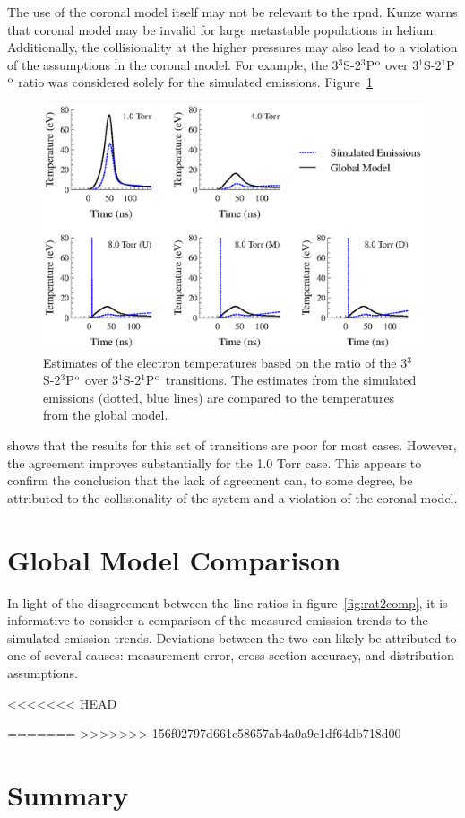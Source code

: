 The use of the coronal model itself may not be relevant to the \acs{rpnd}. Kunze
\cite{Kunze2009} warns that coronal model may be invalid for large metastable
populations in helium. Additionally, the collisionality at the higher pressures
may also lead to a violation of the assumptions in the coronal model. For
example, the 3$^3$S-2$^3$P$^\mathrm{o}$ over 3$^1$S-2$^1$P$^\mathrm{o}$ ratio was considered
solely for the simulated emissions. Figure~\ref{fig:rat1comp}
\begin{figure}
  \centering
  \includegraphics{./chapters/emissions/figures/rat1comp.eps}
  \caption{Estimates of the electron temperatures based on the ratio of the
    3$^3$S-2$^3$P$^\mathrm{o}$ over 3$^1$S-2$^1$P$^\mathrm{o}$ transitions. The estimates from
    the simulated emissions (dotted, blue lines) are compared to the temperatures
    from the global model.}
  \label{fig:rat1comp}
\end{figure}
shows that the results for this set of transitions are poor for most cases.
However, the agreement improves substantially for the 1.0 Torr case. This
appears to confirm the conclusion that the lack of agreement can, to some
degree, be attributed to the collisionality of the system and a violation of the
coronal model.

\section{Global Model Comparison}

In light of the disagreement between the line ratios in
figure~\ref{fig:rat2comp}, it is informative to consider a comparison of the
measured emission trends to the simulated emission trends. Deviations between
the two can likely be attributed to one of several causes: measurement error,
cross section accuracy, and distribution assumptions.

<<<<<<< HEAD

=======
>>>>>>> 156f02797d661c58657ab4a0a9c1df64db718d00
\section{Summary}
